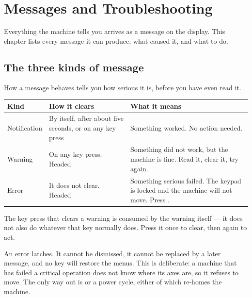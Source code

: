 \chapter{Messages and Troubleshooting}
\label{ch:messages}

Everything the machine tells you arrives as a message on the display. This
chapter lists every message it can produce, what caused it, and what to do.

\section{The three kinds of message}

How a message behaves tells you how serious it is, before you have even read
it.

\begin{center}\small
\begin{tabular}{@{}L{26mm}L{40mm}L{50mm}@{}}
\toprule
\textbf{Kind} & \textbf{How it clears} & \textbf{What it means} \\
\midrule
Notification & By itself, after about five seconds, or on any key press &
  Something worked. No action needed. \\
\addlinespace
Warning & On any key press. Headed  &
  Something did not work, but the machine is fine. Read it, clear it, try
  again. \\
\addlinespace
Error & It does not clear. Headed  &
  Something serious failed. The keypad is locked and the machine will not
  move. Press . \\
\bottomrule
\end{tabular}
\end{center}

\begin{wbnote}
The key press that clears a warning is consumed by the warning itself --- it
does not also do whatever that key normally does. Press it once to clear, then
again to act.
\end{wbnote}

\begin{wbwarning}
An error latches. It cannot be dismissed, it cannot be replaced by a later
message, and no key will restore the menus. This is deliberate: a machine that
has failed a critical operation does not know where its axes are, so it refuses
to move. The only way out is  or a power cycle, either of which
re-homes the machine.
\end{wbwarning}

